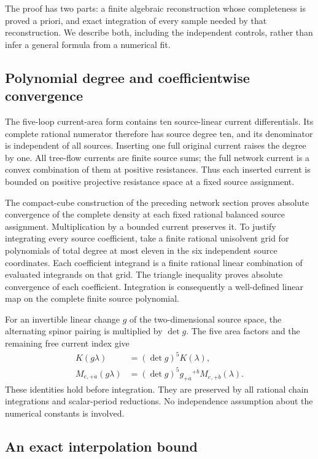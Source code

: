 The proof has two parts: a finite algebraic reconstruction whose
completeness is proved a priori, and exact integration of every sample
needed by that reconstruction. We describe both, including the
independent controls, rather than infer a general formula from a
numerical fit.

\subsection{Polynomial degree and coefficientwise convergence}

The five-loop current-area form contains ten source-linear current
differentials. Its complete rational numerator therefore has source
degree ten, and its denominator is independent of all sources. Inserting
one full original current raises the degree by one. All tree-flow
currents are finite source sums; the full network current is a convex
combination of them at positive resistances. Thus each inserted current
is bounded on positive projective resistance space at a fixed source
assignment.

The compact-cube construction of the preceding network section proves
absolute convergence of the complete density at each fixed rational
balanced source assignment. Multiplication by a bounded current
preserves it. To justify integrating every source coefficient, take a
finite rational unisolvent grid for polynomials of total degree at most
eleven in the six independent source coordinates. Each coefficient
integrand is a finite rational linear combination of evaluated
integrands on that grid. The triangle inequality proves absolute
convergence of each coefficient. Integration is consequently a
well-defined linear map on the complete finite source polynomial.

For an invertible linear change $g$ of the two-dimensional source
space, the alternating spinor pairing is multiplied by $\det g$.
The five area factors and the remaining free current index give
\begin{align}
 K(g\lambda)&=(\det g)^5 K(\lambda),\label{currents:scalarcov}\\
 M_{e,+\dot a}(g\lambda)&=(\det g)^5
 g_{+\dot a}{}^{+\dot b}M_{e,+\dot b}(\lambda).
 \label{currents:vectorcov}
\end{align}
These identities hold before integration. They are preserved by all
rational chain integrations and scalar-period reductions. No
independence assumption about the numerical constants is involved.

\subsection{An exact interpolation bound}

